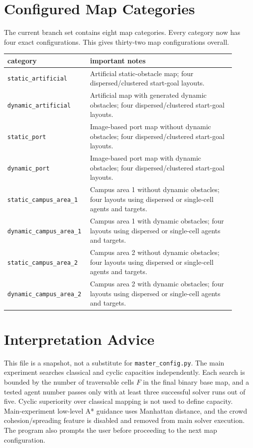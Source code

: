 \documentclass[11pt]{article}
\begin{document}
\section{Configured Map Categories}

The current branch set contains eight map categories. Every category now has four exact configurations. This gives thirty-two map configurations overall.

\begin{longtable}{>{\raggedright\arraybackslash}p{0.30\linewidth} >{\raggedright\arraybackslash}p{0.62\linewidth}}
\toprule
category & important notes \\
\midrule
\endhead

\texttt{static\_artificial} & Artificial static-obstacle map; four dispersed/clustered start-goal layouts. \\
\texttt{dynamic\_artificial} & Artificial map with generated dynamic obstacles; four dispersed/clustered start-goal layouts. \\
\texttt{static\_port} & Image-based port map without dynamic obstacles; four dispersed/clustered start-goal layouts. \\
\texttt{dynamic\_port} & Image-based port map with dynamic obstacles; four dispersed/clustered start-goal layouts. \\
\texttt{static\_campus\_area\_1} & Campus area 1 without dynamic obstacles; four layouts using dispersed or single-cell agents and targets. \\
\texttt{dynamic\_campus\_area\_1} & Campus area 1 with dynamic obstacles; four layouts using dispersed or single-cell agents and targets. \\
\texttt{static\_campus\_area\_2} & Campus area 2 without dynamic obstacles; four layouts using dispersed or single-cell agents and targets. \\
\texttt{dynamic\_campus\_area\_2} & Campus area 2 with dynamic obstacles; four layouts using dispersed or single-cell agents and targets. \\

\bottomrule
\end{longtable}

\section{Interpretation Advice}

This file is a snapshot, not a substitute for \texttt{master\_config.py}. The main experiment searches classical and cyclic capacities independently. Each search is bounded by the number of traversable cells $F$ in the final binary base map, and a tested agent number passes only with at least three successful solver runs out of five. Cyclic superiority over classical mapping is not used to define capacity. Main-experiment low-level A* guidance uses Manhattan distance, and the crowd cohesion/spreading feature is disabled and removed from main solver execution. The program also prompts the user before proceeding to the next map configuration.
\end{document}
